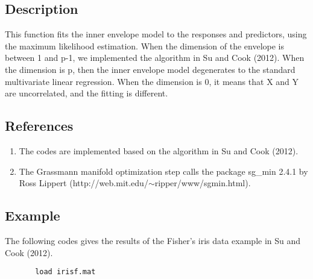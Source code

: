 \documentclass[a4paper,11pt,openany]{memoir}
\begin{document}
\subsection*{Description}

\begin{par}
This function fits the inner envelope model to the responses and predictors, using the maximum likelihood estimation.  When the dimension of the envelope is between 1 and p-1, we implemented the algorithm in Su and Cook (2012).  When the dimension is p, then the inner envelope model degenerates to the standard multivariate linear regression.  When the dimension is 0, it means that X and Y are uncorrelated, and the fitting is different.
\end{par} \vspace{1em}


\subsection*{References}

\begin{enumerate}
\setlength{\itemsep}{-1ex}
   \item The codes are implemented based on the algorithm in Su and Cook (2012).
   \item The Grassmann manifold optimization step calls the package sg\_min 2.4.1 by Ross Lippert (http://web.mit.edu/$\sim$ripper/www/sgmin.html).
\end{enumerate}


\subsection*{Example}

\begin{par}
The following codes gives the results of the Fisher's iris data example in Su and Cook (2012).
\end{par} \vspace{1em}

\begin{verbatim}       load irisf.mat\end{verbatim}
    
\end{document}
